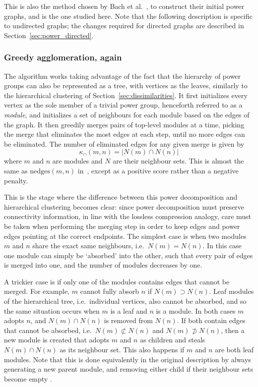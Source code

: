 This is also the method chosen by Bach et al.\ \cite{Bach2017}, to construct their initial power graphs, and is the one studied here. Note that the following description is specific to undirected graphs; the changes required for directed graphs are described in Section~\ref{sec:power_directed}.

\subsubsection{Greedy agglomeration, again}
The algorithm works taking advantage of the fact that the hierarchy of power groups can also be represented as a tree, with vertices as the leaves, similarly to the hierarchical clustering of Section~\ref{sec:dissimilarities}. It first initializes every vertex as the sole member of a trivial power group, henceforth referred to as a \emph{module}, and initializes a set of neighbours for each module based on the edges of the graph.
It then greedily merges pairs of top-level modules at a time, picking the merge that eliminates the most edges at each step, until no more edges can be eliminated.
The number of eliminated edges for any given merge is given by
\begin{equation}
    \kappa_{\cap}(m, n) = |N(m)\cap N(n)|
    \label{eq:kappa_cap}
\end{equation}
where $m$ and $n$ are modules and $N$ are their neighbour sets.
This is almost the same as $\mathrm{nedges}(m,n)$ in~\cite{Dwyer2014}, except as a positive score rather than a negative penalty.

This is the stage where the difference between this power decomposition and hierarchical clustering becomes clear: since power decomposition must preserve connectivity information, in line with the lossless compression analogy, care must be taken when performing the merging step in order to keep edges and power edges pointing at the correct endpoints. 
The simplest case is when two modules $m$ and $n$ share the exact same neighbours, i.e.\ $N(m)=N(n)$. In this case one module can simply be `absorbed' into the other, such that every pair of edges is merged into one, and the number of modules decreases by one. 

A trickier case is if only one of the modules contains edges that cannot be merged. For example, $m$ cannot fully absorb $n$ if $N(m)\supset N(n)$. Leaf modules of the hierarchical tree, i.e.\ individual vertices, also cannot be absorbed, and so the same situation occurs when $m$ is a leaf and $n$ is a module. In both cases $m$ adopts $n$, and $N(m)\cap N(n)$ is removed from $N(n)$.
If both contain edges that cannot be absorbed, i.e.\ $N(m)\not\subset N(n)$ and $N(m)\not\supset N(n)$, then a new module is created that adopts $m$ and $n$ as children and steals $N(m)\cap N(n)$ as its neighbour set. This also happens if $m$ and $n$ are both leaf modules.
Note that this is done equivalently in the original description by always generating a new parent module, and removing either child if their neighbour sets become empty \cite{Dwyer2014}.

